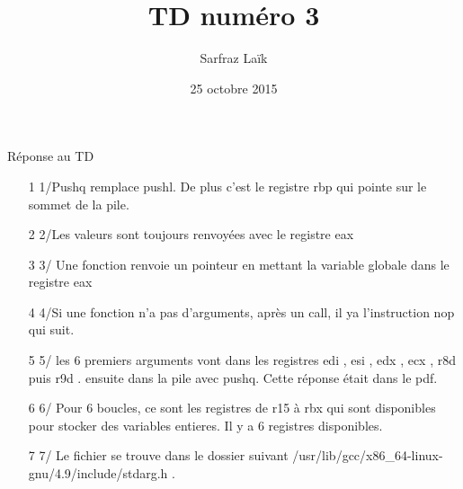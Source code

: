 \documentclass{article}
\title{ TD numéro 3}
\date{25 octobre 2015}
\author{Sarfraz Laïk}
\begin{document}
\maketitle
Réponse au TD

\begin{itemize}
\item[1] 1/Pushq remplace pushl. De plus c'est le registre rbp qui pointe sur le sommet de la pile.
\item[2] 2/Les valeurs sont toujours renvoyées avec le registre eax
\item[3] 3/ Une fonction renvoie un pointeur en mettant la variable globale dans le registre eax
\item[4] 4/Si une fonction n'a pas d'arguments, après un call, il ya l'instruction nop qui suit.
\item[5] 5/ les 6 premiers arguments vont dans les registres edi , esi , edx , ecx , r8d puis r9d . ensuite dans la pile avec pushq. Cette réponse était dans le pdf.
\item[6] 6/ Pour 6 boucles, ce sont les registres de r15 à rbx qui sont disponibles pour stocker des variables entieres. Il y a 6 registres disponibles.
\item[7] 7/ Le fichier se trouve dans le dossier suivant /usr/lib/gcc/x86_64-linux-gnu/4.9/include/stdarg.h . 
\end{itemize}
\end{document}
